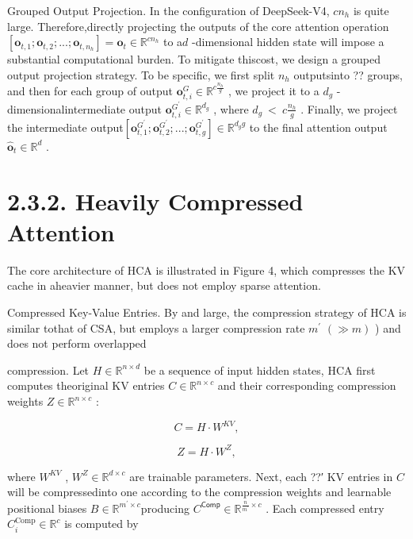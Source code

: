 \documentclass[
  10
]{article}
\begin{document}
Grouped Output Projection. In the configuration of DeepSeek-V4,
\(c n _ { h }\) is quite large. Therefore,directly projecting the
outputs of the core attention operation
\(\left[ \mathbf { o } _ { t , 1 } ; \mathbf { o } _ { t , 2 } ; . . . ; \mathbf { o } _ { t , n _ { h } } \right] = \mathbf { o } _ { t } \in \mathbb { R } ^ { c n _ { h } }\)
to a\(d\) -dimensional hidden state will impose a substantial
computational burden. To mitigate thiscost, we design a grouped output
projection strategy. To be specific, we first split \(n _ { h }\)
outputsinto ?? groups, and then for each group of output
\({ \mathbf o } _ { t , i } ^ { G } \in \mathbb { R } ^ { c \frac { n _ { h } } { g } }\)
, we project it to a \(d _ { g }\) -dimensionalintermediate output
\({ \mathbf o } _ { t , i } ^ { G ^ { \prime } } \in \mathbb { R } ^ { d _ { g } }\)
, where \(d _ { g } \ < \ c \frac { n _ { h } } { g }\) . Finally, we
project the intermediate
output\([ \mathbf { o } _ { t , 1 } ^ { G ^ { \prime } } ; \mathbf { o } _ { t , 2 } ^ { G ^ { \prime } } ; . . . ; \mathbf { o } _ { t , g } ^ { G ^ { \prime } } ] \in \mathbb { R } ^ { d _ { g } g }\)
to the final attention output
\(\hat { \mathbf { o } } _ { t } \in \mathbb { R } ^ { d }\) .

\section{2.3.2. Heavily Compressed
Attention}\label{heavily-compressed-attention}

The core architecture of HCA is illustrated in Figure 4, which
compresses the KV cache in aheavier manner, but does not employ sparse
attention.

Compressed Key-Value Entries. By and large, the compression strategy of
HCA is similar tothat of CSA, but employs a larger compression rate
\(m ^ { \prime }\) \(( \gg m )\) ) and does not perform overlapped

compression. Let \(H \in \mathbb { R } ^ { n \times d }\) be a sequence
of input hidden states, HCA first computes theoriginal KV entries
\(C \in \mathbb { R } ^ { n \times c }\) and their corresponding
compression weights \(Z \in \mathbb { R } ^ { n \times c }\) :

\[
C = H \cdot W ^ {K V}, \tag {20}
\]

\[
Z = H \cdot W ^ {Z}, \tag {21}
\]

where \(W ^ { K V }\) , \(W ^ { Z } \in \mathbb { R } ^ { d \times c }\)
are trainable parameters. Next, each ??′ KV entries in \(C\) will be
compressedinto one according to the compression weights and learnable
positional biases
\(B \in \mathbb { R } ^ { m ^ { \prime } \times c }\)producing
\(C ^ { \mathsf { C o m p } } \in \mathbb { R } ^ { \frac { n } { m ^ { \prime } } \times c }\)
. Each compressed entry
\(C _ { i } ^ { \mathrm { C o m p } } \in \mathbb { R } ^ { c }\) is
computed by
\end{document}
